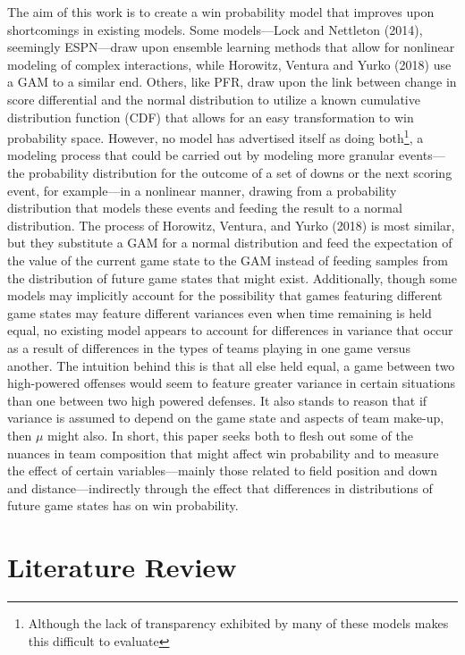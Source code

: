 \documentclass[12pt,twoside]{dukestatscithesis}
\begin{document}
The aim of this work is to create a win probability model that improves upon shortcomings in existing models. Some models---Lock and Nettleton (2014), seemingly ESPN---draw upon ensemble learning methods that allow for nonlinear modeling of complex interactions, while Horowitz, Ventura and Yurko (2018) use a GAM to a similar end. Others, like PFR, draw upon the link between change in score differential and the normal distribution to utilize a known cumulative distribution function (CDF) that allows for an easy transformation to win probability space. However, no model has advertised itself as doing both\footnote{Although the lack of transparency exhibited by many of these models makes this difficult to evaluate}, a modeling process that could be carried out by modeling more granular events---the probability distribution for the outcome of a set of downs or the next scoring event, for example---in a nonlinear manner, drawing from a probability distribution that models these events and feeding the result to a normal distribution. The process of Horowitz, Ventura, and Yurko (2018) is most similar, but they substitute a GAM for a normal distribution and feed the expectation of the value of the current game state to the GAM instead of feeding samples from the distribution of future game states that might exist. Additionally, though some models may implicitly account for the possibility that games featuring different game states may feature different variances even when time remaining is held equal, no existing model appears to account for differences in variance that occur as a result of differences in the types of teams playing in one game versus another. The intuition behind this is that all else held equal, a game between two high-powered offenses would seem to feature greater variance in certain situations than one between two high powered defenses. It also stands to reason that if variance is assumed to depend on the game state and aspects of team make-up, then \(\mu\) might also. In short, this paper seeks both to flesh out some of the nuances in team composition that might affect win probability and to measure the effect of certain variables---mainly those related to field position and down and distance---indirectly through the effect that differences in distributions of future game states has on win probability.

\hypertarget{literature-review}{%
\chapter*{Literature Review}\label{literature-review}}
\end{document}
